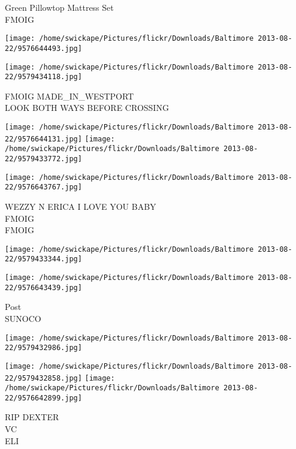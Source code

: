 \documentclass[10pt,letterpaper]{article}
\begin{document}
Green Pillowtop Mattress Set\\
FMOIG\\
\pagebreak

\texttt{[image: /home/swickape/Pictures/flickr/Downloads/Baltimore 2013-08-22/9576644493.jpg]}

\vspace{0.25in}
\texttt{[image: /home/swickape/Pictures/flickr/Downloads/Baltimore 2013-08-22/9579434118.jpg]}

FMOIG MADE\_IN\_WESTPORT\\
LOOK BOTH WAYS BEFORE CROSSING\\
\pagebreak

\texttt{[image: /home/swickape/Pictures/flickr/Downloads/Baltimore 2013-08-22/9576644131.jpg]}
\texttt{[image: /home/swickape/Pictures/flickr/Downloads/Baltimore 2013-08-22/9579433772.jpg]}

\vspace{0.25in}
\texttt{[image: /home/swickape/Pictures/flickr/Downloads/Baltimore 2013-08-22/9576643767.jpg]}

WEZZY N ERICA I LOVE YOU BABY\\
FMOIG\\
FMOIG\\
\pagebreak

\texttt{[image: /home/swickape/Pictures/flickr/Downloads/Baltimore 2013-08-22/9579433344.jpg]}

\vspace{0.25in}
\texttt{[image: /home/swickape/Pictures/flickr/Downloads/Baltimore 2013-08-22/9576643439.jpg]}

Post\\
SUNOCO\\
\pagebreak

\texttt{[image: /home/swickape/Pictures/flickr/Downloads/Baltimore 2013-08-22/9579432986.jpg]}

\vspace{0.25in}
\texttt{[image: /home/swickape/Pictures/flickr/Downloads/Baltimore 2013-08-22/9579432858.jpg]}
\texttt{[image: /home/swickape/Pictures/flickr/Downloads/Baltimore 2013-08-22/9576642899.jpg]}

RIP DEXTER\\
VC\\
ELI\\
\pagebreak
\end{document}
